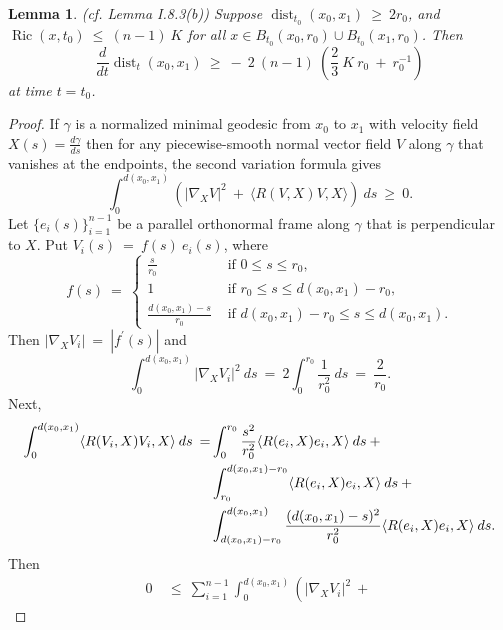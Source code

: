 \documentclass[12pt]{amsart}
\newcommand{\dist}{\operatorname{dist}}
\newcommand{\Ric}{\operatorname{Ric}}
\numberwithin{equation}{section}
\theoremstyle{plain}
\newtheorem{lemma}[equation]{Lemma}
\theoremstyle{definition}
\theoremstyle{remark}
\begin{document}
\begin{lemma} \label{distancedist} (cf. Lemma I.8.3(b))
Suppose $\dist_{t_0}(x_0, x_1) \: \ge \: 2r_0$, and
$\Ric(x, t_0) \: \le \: (n-1) \: K$ for all $x\in B_{t_0}(x_0, r_0) \cup
B_{t_0}(x_1, r_0)$. Then
\begin{equation}
\frac{d}{dt} \dist_t(x_0, x_1) \: \ge \:
- \: 2 \: (n-1) \: \left( \frac23 \: K \: r_0 \: + \: r_0^{-1} \right)
\end{equation}
at time $t = t_0$.
\end{lemma}
\begin{proof}
If $\gamma$ is a normalized minimal geodesic from $x_0$ to $x_1$ with
velocity field $X(s) = \frac{d\gamma}{ds}$ then
for any piecewise-smooth 
normal
vector field $V$ along $\gamma$ that vanishes at the
endpoints, the second variation formula gives
\begin{equation}
\int_0^{d(x_0, x_1)} \left( \Big| \nabla_X V \Big|^2 \: + \:
\langle R(V, X)V, X \rangle \right) \: ds \: \ge \: 0.
\end{equation}
Let $\{e_i(s)\}_{i=1}^{n-1}$ be a parallel orthonormal frame along
$\gamma$ that is perpendicular to $X$.
Put $V_i(s) \: = \: f(s) \: e_i(s)$, where
\begin{equation}
f(s) \: = \: 
\begin{cases}
\frac{s}{r_0} & \text{ if } 0 \le s \le r_0, \\
1 & \text{ if } r_0 \le s \le d(x_0, x_1)-r_0, \\
\frac{d(x_0, x_1)-s}{r_0} & \text{ if } d(x_0, x_1)-r_0 \le s \le d(x_0, x_1).
\end{cases}
\end{equation}
Then $\Big| \nabla_X V_i \Big| \: = \: |f^\prime(s)|$ and
\begin{equation}
\int_0^{d(x_0, x_1)}  \Big| \nabla_X V_i \Big|^2 \: ds \: = \:
2 \int_0^{r_0} \frac{1}{r_0^2} \: ds \: = \: \frac{2}{r_0}.
\end{equation}
Next,
\begin{align}
\int_0^{d(x_0, x_1)} 
\langle R(V_i, X)V_i, X \rangle \: ds \: = &
\int_0^{r_0} \frac{s^2}{r_0^2} \langle R(e_i, X)e_i, X \rangle \: ds \: +  \\
& \int_{r_0}^{d(x_0,x_1)-r_0} \langle R(e_i, X)e_i, X \rangle \: ds \: + \notag \\
& \int_{d(x_0,x_1)-r_0}^{d(x_0,x_1)} \frac{(d(x_0,x_1) - s)^2}{r_0^2} \langle R(e_i, X)e_i, X \rangle \: ds.
\notag
\end{align}
Then
\begin{align}
0 \: & \le \: \sum_{i=1}^{n-1} \int_0^{d(x_0, x_1)} \left( \Big| \nabla_X V_i \Big|^2 \: + \:

\end{align}
\end{proof}
\end{document}
